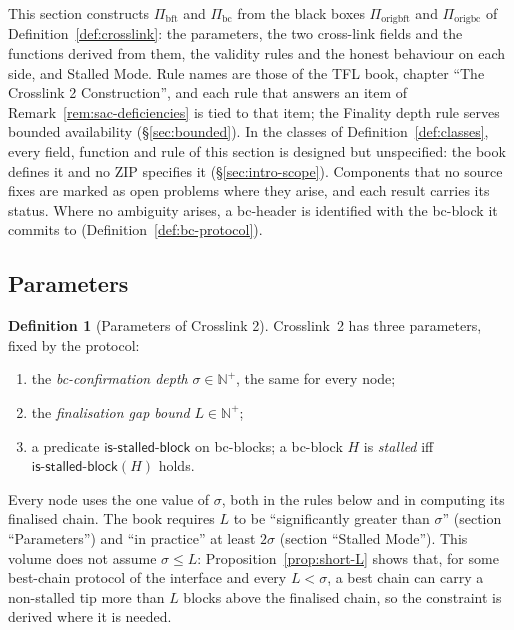 \documentclass[11pt,a4paper]{article}
\theoremstyle{definition}
\newtheorem{definition}[theorem]{Definition}
\newcommand{\N}{\mathbb{N}}
\newcommand{\bc}{\mathrm{bc}}
\newcommand{\bft}{\mathrm{bft}}
\newcommand{\Piorigbc}{\Pi_{\mathrm{origbc}}}
\newcommand{\Piorigbft}{\Pi_{\mathrm{origbft}}}
\newcommand{\Pibc}{\Pi_{\bc}}
\newcommand{\Pibft}{\Pi_{\bft}}
\newcommand{\isstalledblock}{\mathsf{is\text{-}stalled\text{-}block}}
\begin{document}
This section constructs $\Pibft$ and $\Pibc$ from the black boxes
$\Piorigbft$ and $\Piorigbc$ of Definition~\ref{def:crosslink}: the
parameters, the two cross-link fields and the functions derived from them,
the validity rules and the honest behaviour on each side, and Stalled Mode.
Rule names are those of the TFL book, chapter ``The Crosslink 2
Construction'', and each rule that answers an item of
Remark~\ref{rem:sac-deficiencies} is tied to that item; the Finality depth
rule serves bounded availability (\S\ref{sec:bounded}). In the classes of
Definition~\ref{def:classes}, every field, function and rule of this section
is designed but unspecified: the book defines it and no ZIP specifies it
(\S\ref{sec:intro-scope}). Components that no source fixes are marked as open
problems where they arise, and each result carries its status. Where no
ambiguity arises, a bc-header is identified with the bc-block it commits to
(Definition~\ref{def:bc-protocol}).

\subsection{Parameters}\label{sec:cons-params}

\begin{definition}[Parameters of Crosslink 2]\label{def:params}
Crosslink~2 has three parameters, fixed by the protocol:
\begin{enumerate}[label=(\roman*)]
\item the \emph{bc-confirmation depth} $\sigma \in \N^{+}$, the same for every
  node;
\item the \emph{finalisation gap bound} $L \in \N^{+}$;
\item a predicate $\isstalledblock$ on bc-blocks; a bc-block $H$ is
  \emph{stalled} iff $\isstalledblock(H)$ holds.
\end{enumerate}
\end{definition}

Every node uses the one value of $\sigma$, both in the rules below and in
computing its finalised chain. The book requires $L$ to be ``significantly
greater than $\sigma$'' (section ``Parameters'') and ``in practice'' at least
$2\sigma$ (section ``Stalled Mode''). This volume does not assume
$\sigma \le L$: Proposition~\ref{prop:short-L} shows that, for some
best-chain protocol of the interface and every $L < \sigma$, a best chain can
carry a non-stalled tip more than $L$ blocks above the finalised chain, so the
constraint is derived where it is needed.
\end{document}
